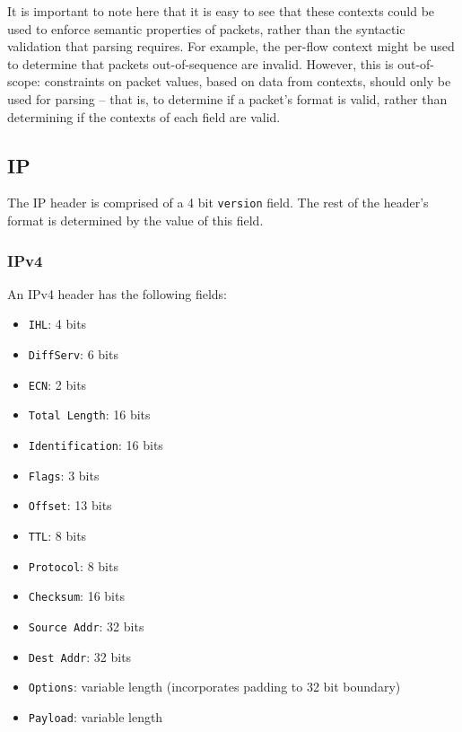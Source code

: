 \documentclass[10pt,a4paper]{article}
\begin{document}
It is important to note here that it is easy to see that these contexts could be used to
enforce semantic properties of packets, rather than the syntactic validation that parsing
requires. For example, the per-flow context might be used to determine that packets
out-of-sequence are invalid. However, this is out-of-scope: constraints on packet values,
based on data from contexts, should only be used for parsing -- that is, to determine if
a packet's format is valid, rather than determining if the contexts of each field are
valid.

\subsection{IP}

The IP header is comprised of a 4 bit \texttt{version} field. The rest of the header's
format is determined by the value of this field.

\subsubsection*{IPv4}

An IPv4 header has the following fields:
\begin{itemize}
\item \texttt{IHL}: 4 bits
\item \texttt{DiffServ}: 6 bits
\item \texttt{ECN}: 2 bits
\item \texttt{Total Length}: 16 bits
\item \texttt{Identification}: 16 bits
\item \texttt{Flags}: 3 bits
\item \texttt{Offset}: 13 bits
\item \texttt{TTL}: 8 bits
\item \texttt{Protocol}: 8 bits
\item \texttt{Checksum}: 16 bits
\item \texttt{Source Addr}: 32 bits
\item \texttt{Dest Addr}: 32 bits
\item \texttt{Options}: variable length (incorporates padding to 32 bit boundary)
\item \texttt{Payload}: variable length
\end{itemize}
\end{document}
